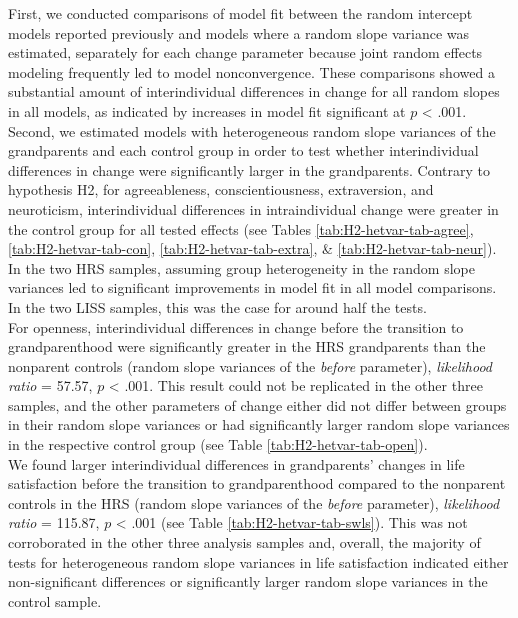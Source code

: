 \documentclass[
  english,
  man,floatsintext]{apa7}
\begin{document}
First, we conducted comparisons of model fit between the random intercept models reported previously and models where a random slope variance was estimated, separately for each change parameter because joint random effects modeling frequently led to model nonconvergence. These comparisons showed a substantial amount of interindividual differences in change for all random slopes in all models, as indicated by increases in model fit significant at \(p\) \textless{} .001.\\
Second, we estimated models with heterogeneous random slope variances of the grandparents and each control group in order to test whether interindividual differences in change were significantly larger in the grandparents. Contrary to hypothesis H2, for agreeableness, conscientiousness, extraversion, and neuroticism, interindividual differences in intraindividual change were greater in the control group for all tested effects (see Tables \ref{tab:H2-hetvar-tab-agree}, \ref{tab:H2-hetvar-tab-con}, \ref{tab:H2-hetvar-tab-extra}, \& \ref{tab:H2-hetvar-tab-neur}). In the two HRS samples, assuming group heterogeneity in the random slope variances led to significant improvements in model fit in all model comparisons. In the two LISS samples, this was the case for around half the tests.\\
For openness, interindividual differences in change before the transition to grandparenthood were significantly greater in the HRS grandparents than the nonparent controls (random slope variances of the \emph{before} parameter), \emph{likelihood ratio} = 57.57, \(p\) \textless{} .001. This result could not be replicated in the other three samples, and the other parameters of change either did not differ between groups in their random slope variances or had significantly larger random slope variances in the respective control group (see Table \ref{tab:H2-hetvar-tab-open}).\\
We found larger interindividual differences in grandparents' changes in life satisfaction before the transition to grandparenthood compared to the nonparent controls in the HRS (random slope variances of the \emph{before} parameter), \emph{likelihood ratio} = 115.87, \(p\) \textless{} .001 (see Table \ref{tab:H2-hetvar-tab-swls}). This was not corroborated in the other three analysis samples and, overall, the majority of tests for heterogeneous random slope variances in life satisfaction indicated either non-significant differences or significantly larger random slope variances in the control sample.
\end{document}
